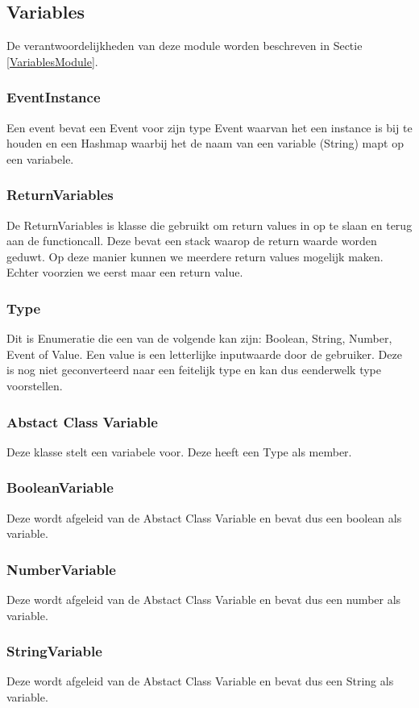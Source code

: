 \documentclass[]{article}
\begin{document}
\subsection{Variables}
De verantwoordelijkheden van deze module worden beschreven in Sectie \ref{VariablesModule}.
\subsubsection{EventInstance}
Een event bevat een Event voor zijn type Event waarvan het een instance is bij te houden en een Hashmap \cite{hashmap} waarbij het de naam van een variable (String) mapt op een variabele.
\subsubsection{ReturnVariables}
De ReturnVariables is klasse die gebruikt om return values in op te slaan en terug aan de functioncall. Deze bevat een stack \cite{stack} waarop de return waarde worden geduwt. Op deze manier kunnen we meerdere return values mogelijk maken. Echter voorzien we eerst maar een return value.
\subsubsection{Type}
\label{Type}
Dit is Enumeratie die een van de volgende kan zijn: Boolean, String, Number, Event of Value. Een value is een letterlijke inputwaarde door de gebruiker. Deze is nog niet geconverteerd naar een feitelijk type en kan dus eenderwelk type voorstellen.
\subsubsection{Abstact Class Variable}
\label{variable}
Deze klasse stelt een variabele voor. Deze heeft een Type als member.
\subsubsection{BooleanVariable}
Deze wordt afgeleid van de Abstact Class Variable en bevat dus een boolean als variable.
\subsubsection{NumberVariable}
Deze wordt afgeleid van de Abstact Class Variable en bevat dus een number als variable.
\subsubsection{StringVariable}
Deze wordt afgeleid van de Abstact Class Variable en bevat dus een String als variable.
\end{document}
